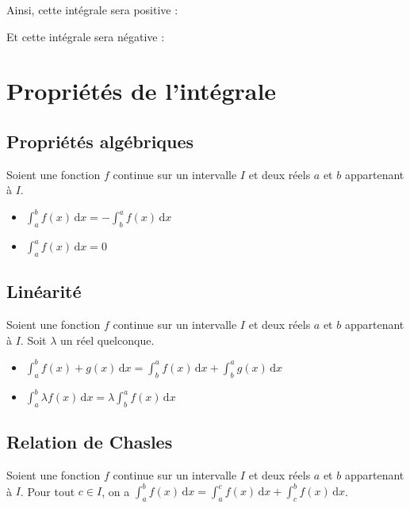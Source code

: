 	Ainsi, cette intégrale sera positive :
	
	
	Et cette intégrale sera négative :
	
	
	\section{Propriétés de l'intégrale}
	
	\subsection{Propriétés algébriques}
	
	\begin{formula}[Propriétés]
		Soient une fonction $f$ continue sur un intervalle $I$ et deux réels $a$ et $b$ appartenant à $I$.
		\begin{itemize}
			\item $\int_{a}^{b} f(x) \, \mathrm{d}x = - \int_{b}^{a} f(x) \, \mathrm{d}x$
			\item $\int_{a}^{a} f(x) \, \mathrm{d}x = 0$
		\end{itemize}
	\end{formula}
	
	\subsection{Linéarité}
	
	\begin{formula}
		Soient une fonction $f$ continue sur un intervalle $I$ et deux réels $a$ et $b$ appartenant à $I$. Soit $\lambda$ un réel quelconque.
		\begin{itemize}
			\item $\int_{a}^{b} f(x) + g(x) \, \mathrm{d}x = \int_{b}^{a} f(x) \, \mathrm{d}x + \int_{b}^{a} g(x) \, \mathrm{d}x$
			\item $\int_{a}^{b} \lambda f(x) \, \mathrm{d}x = \lambda \int_{b}^{a} f(x) \, \mathrm{d}x$
		\end{itemize}
	\end{formula}
	
	\subsection{Relation de Chasles}
	
	\begin{formula}
		Soient une fonction $f$ continue sur un intervalle $I$ et deux réels $a$ et $b$ appartenant à $I$.
		Pour tout $c \in I$, on a $\int_{a}^{b} f(x) \, \mathrm{d}x = \int_{a}^{c} f(x) \, \mathrm{d}x + \int_{c}^{b} f(x) \, \mathrm{d}x$.
	\end{formula}
	
